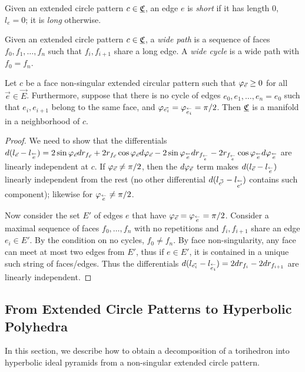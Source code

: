 
\begin{define}
Given an extended circle pattern $c\in {\underline{\mathfrak{C}}}$, an edge $e$ is \emph{short}
if it has length 0, $l_e = 0$;
it is \emph{long} otherwise.
\end{define}


\begin{define}
Given an extended circle pattern $c\in {\underline{\mathfrak{C}}}$, a \emph{wide path}
is a sequence of faces $f_0,f_1,\ldots,f_n$
such that $f_i,f_{i+1}$ share a long edge.
A \emph{wide cycle} is a wide path with $f_0 = f_n$.
\end{define}


\begin{lemma}
\label{l:manifold_point}
Let $c$ be a face non-singular extended circular pattern
such that $\varphi_{\vec{e}} \geq 0$ for all $\vec{e}\in\vec{E}$.
Furthermore, suppose that there is no cycle of edges
$e_0, e_1, \ldots, e_n = e_0$ such that
$e_i, e_{i+1}$ belong to the same face,
and $\varphi_{\vec{e_i}} = \varphi_{\overset{\leftarrow}{e_i}} = \pi/2$.
Then ${\underline{\mathfrak{C}}}$ is a manifold in a neighborhood of $c$.
\end{lemma}
\begin{proof}
We need to show that the differentials
$d(l_{\vec{e}} - l_{\overset{\leftarrow}{e}})
= 2\sin \varphi_{\vec{e}} d r_{f_{\vec{e}}}
+ 2r_{f_{\vec{e}}} \cos \varphi_{\vec{e}} d \varphi_{\vec{e}}
- 2\sin \varphi_{\overset{\leftarrow}{e}} d r_{f_{\overset{\leftarrow}{e}}}
- 2r_{f_{\overset{\leftarrow}{e}}} \cos \varphi_{\overset{\leftarrow}{e}} d \varphi_{\overset{\leftarrow}{e}}
$
are linearly independent at $c$.
If $\varphi_{\vec{e}} \neq \pi/2$,
then the $d\varphi_{\vec{e}}$ term makes $d(l_{\vec{e}} - l_{\overset{\leftarrow}{e}})$
linearly independent from the rest
(no other differential $d(l_{\vec{e'}} - l_{\overset{\leftarrow}{e'}})$
contains such component);
likewise for $\varphi_{\overset{\leftarrow}{e}} \neq \pi/2$.


Now consider the set $E'$ of edges $e$ that have
$\varphi_{\vec{e}} = \varphi_{\overset{\leftarrow}{e}} = \pi/2$.
Consider a maximal sequence of faces $f_0,\ldots,f_n$
with no repetitions and $f_i,f_{i+1}$ share
an edge $e_i \in E'$.
By the condition on no cycles,
$f_0 \neq f_n$.
By face non-singularity, any face can meet at most two
edges from $E'$, thus if $e\in E'$,
it is contained in a unique such string of faces/edges.
Thus the differentials
$d(l_{\vec{e_i}} - l_{\overset{\leftarrow}{e_i}}) = 2dr_{f_i} - 2dr_{f_{i+1}}$
are linearly independent.
\end{proof}



\subsection{From Extended Circle Patterns to Hyperbolic Polyhedra}
In this section, we describe how to obtain a
decomposition of a torihedron into hyperbolic ideal pyramids
from a non-singular extended circle pattern.

